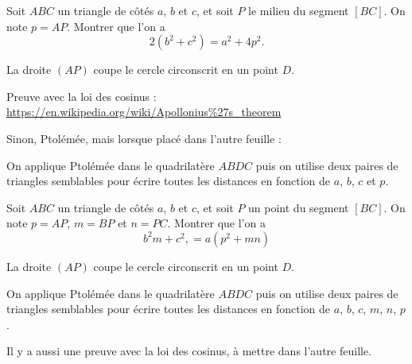 \begin{exo}
Soit $ABC$ un triangle de côtés $a$, $b$ et $c$, et soit $P$ le milieu du segment $[BC]$. On note $p=AP$.
Montrer que l'on a 
\[ 2(b^2+c^2)=a^2+4p^2.\]
\begin{hint}
La droite $(AP)$ coupe le cercle circonscrit en un point $D$. 
\end{hint}
\begin{sol}


Preuve avec la loi des cosinus : \url{https://en.wikipedia.org/wiki/Apollonius%27s_theorem}

Sinon, Ptolémée, mais lorsque placé dans l'autre feuille : 

On applique Ptolémée dans le quadrilatère $ABDC$ puis on utilise deux paires de triangles semblables pour écrire toutes les distances en fonction de $a$, $b$, $c$ et $p$.
\end{sol}
\end{exo}

\begin{exo}
Soit $ABC$ un triangle de côtés $a$, $b$ et $c$, et soit $P$ un point du segment $[BC]$. On note $p=AP$, $m=BP$ et $n=PC$.
Montrer que l'on a 
\[ b^2m+c^2,=a(p^2+mn)\]
\begin{hint}
La droite $(AP)$ coupe le cercle circonscrit en un point $D$. 
\end{hint}
\begin{sol}
On applique Ptolémée dans le quadrilatère $ABDC$ puis on utilise deux paires de triangles semblables pour écrire toutes les distances en fonction de $a$, $b$, $c$, $m$, $n$, $p$.

Il y a aussi une preuve avec la loi des cosinus, à mettre dans l'autre feuille.
\end{sol}
\end{exo}



\indications
\correction



